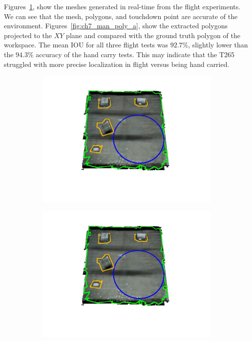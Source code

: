 Figures~\ref{fig:ch7_flight_mesh_a}, show the meshes generated in real-time from the flight experiments. We can see that the mesh, polygons, and touchdown point are accurate of the environment. Figures~\ref{fig:ch7_man_poly_a}, show the extracted polygons projected to the $XY$ plane and compared with the ground truth polygon of the workspace. The mean \ac{IOU} for all three flight tests was $92.7\%$, slightly lower than the $94.3$\% accuracy of the hand carry tests.  This may indicate that the T265 struggled with more precise localization in flight versus being hand carried. 

\begin{figure}[!htb]
  \centering
  \begin{subfigure}[t]{.28\linewidth}
    \centering  \includegraphics[page=1,clip,trim=3.5cm 3cm 3.5cm 1.4cm,width=.99\linewidth]{chapter_7_experiments/imgs/mesh_flight.pdf}
    \caption{\label{fig:ch7_flight_mesh_a}}
  \end{subfigure}
  \begin{subfigure}[t]{.28\linewidth}
    \centering  \includegraphics[page=2,clip,trim=3.5cm 3cm 3.5cm 1.4cm,width=.99\linewidth]{chapter_7_experiments/imgs/mesh_flight.pdf}

\end{subfigure}
\end{figure}
